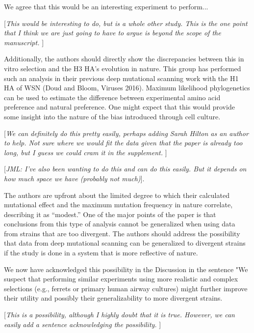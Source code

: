 \documentclass[11pt, oneside]{article}   	%
\newcommand{\comment}[1]{{\color{red}[\textsl{#1}]}}
\newcommand{\response}[1]{{\color{black}#1}}
\begin{document}
\response{We agree that this would be an interesting experiment to perform...}

\comment{This would be interesting to do, but is a whole other study.
This is the one point that I think we are just going to have to argue is beyond the scope of the manuscript.
}

Additionally, the authors should directly show the discrepancies between this in vitro selection and the H3 HA's evolution in nature. This group has performed such an analysis in their previous deep mutational scanning work with the H1 HA of WSN (Doud and Bloom, Viruses 2016). Maximum likelihood phylogenetics can be used to estimate the difference between experimental amino acid preference and natural preference. One might expect that this would provide some insight into the nature of the bias introduced through cell culture. 

\comment{We can definitely do this pretty easily, perhaps adding Sarah Hilton as an author to help.
Not sure where we would fit the data given that the paper is already too long, but I guess we could cram it in the supplement.
}

\comment{JML: I've also been wanting to do this and can do this easily. But it depends on how much space we have (probably not much)}.

The authors are upfront about the limited degree to which their calculated mutational effect and the maximum mutation frequency in nature correlate, describing it as ``modest.'' One of the major points of the paper is that conclusions from this type of analysis cannot be generalized when using data from strains that are too divergent. The authors should address the possibility that data from deep mutational scanning can be generalized to divergent strains if the study is done in a system that is more reflective of nature. 

\response{We now have acknowledged this possibility in the Discussion in the sentence "We suspect that performing similar experiments using more realistic and complex selections (e.g., ferrets or primary human airway cultures) might further improve their utility and possibly their generalizability to more divergent strains.}

\comment{This is a possibility, although I highly doubt that it is true.
However, we can easily add a sentence acknowledging the possibility.
}
\end{document}
